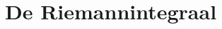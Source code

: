 \documentclass[main.tex]{subfiles}
\begin{document}
\chapter{De Riemannintegraal}
\label{cha:de-riemannintegraal}




\end{document}
